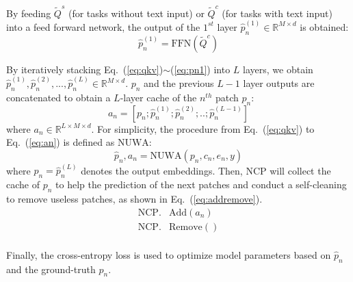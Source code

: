 \documentclass{article}
\begin{document}
By feeding $\tilde{Q}^s$ (for tasks without text input) or $\tilde{Q}^c$ (for tasks with text input) into a feed forward network, the output of the $1^{st}$ layer $\hat{p}_n^{(1)}\in \mathbb{R}^{M\times d}$ is obtained:
\begin{equation}\label{eq:pn1}
\hat{p}_n^{(1)}=\text{FFN}(\tilde{Q}^c)
\end{equation}





By iteratively stacking Eq.~(\ref{eq:qkv})$\sim$(\ref{eq:pn1}) into $L$ layers, we obtain $\hat{p}_n^{(1)}, \hat{p}_n^{(2)}, ..., \hat{p}_n^{(L)}\in \mathbb{R}^{M\times d}$. $p_n$ and the previous $L-1$ layer outputs are concatenated to obtain a $L$-layer cache of the $n^{th}$ patch $p_n$:
\begin{equation}\label{eq:an}
a_n=[p_n;\hat{p}_n^{(1)};\hat{p}_n^{(2)};..;\hat{p}_n^{(L-1)}]
\end{equation}
where $a_n\in \mathbb{R}^{L\times M\times d}$. 
For simplicity, the procedure from Eq.~(\ref{eq:qkv}) to Eq.~(\ref{eq:an}) is defined as $\text{NUWA}$:
\begin{equation}\label{eq:nuwa}
\hat{p}_n, a_n=\text{NUWA}(p_n, c_n, e_n, y)
\end{equation}
where $\hat{p}_n=\hat{p}_n^{(L)}$ denotes the output embeddings. Then, NCP will collect the cache of $p_n$ to help the prediction of the next patches and conduct a self-cleaning to remove useless patches, as shown in Eq.~(\ref{eq:addremove}).
\begin{equation}\label{eq:addremove}
\begin{split}
    \text{NCP}.&\text{Add}(a_n)\\
    \text{NCP}.&\text{Remove}()\\
\end{split}
\end{equation}

Finally, the cross-entropy loss is used to optimize model parameters based on $\hat{p}_n$ and the ground-truth $p_n$.
\end{document}

